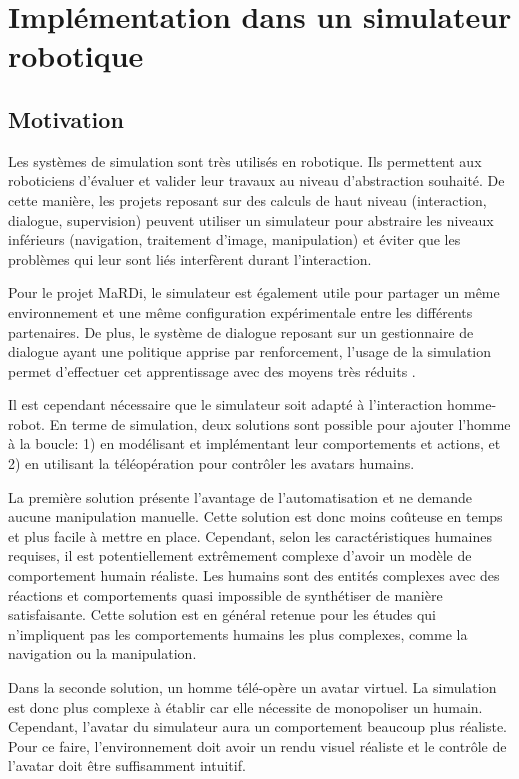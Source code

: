 \documentclass[a4paper,11pt,twoside]{StyleThese}
\begin{document}
\section{Implémentation dans un simulateur robotique}

\subsection{Motivation}
Les systèmes de simulation sont très utilisés en robotique. Ils permettent aux roboticiens d'évaluer et valider leur travaux au niveau d'abstraction souhaité. De cette manière, les projets reposant sur des calculs de haut niveau (interaction, dialogue, supervision) peuvent utiliser un simulateur pour abstraire les niveaux inférieurs (navigation, traitement d'image, manipulation) et éviter que les problèmes qui leur sont liés interfèrent durant l'interaction.

Pour le projet MaRDi, le simulateur est également utile pour partager un même environnement et une même configuration expérimentale entre les différents partenaires. De plus, le système de dialogue reposant sur un gestionnaire de dialogue ayant une politique apprise par renforcement, l'usage de la simulation permet d'effectuer cet apprentissage avec des moyens très réduits \cite{simpar_2014}.

Il est cependant nécessaire que le simulateur soit adapté à l'interaction homme-robot. 
En terme de simulation, deux solutions sont possible pour ajouter l'homme à la boucle: 1) en modélisant et implémentant leur comportements et actions, et 2) en utilisant la téléopération pour contrôler les avatars humains.

La première solution présente l'avantage de l'automatisation et ne demande aucune manipulation manuelle. Cette solution est donc moins coûteuse en temps et plus facile à mettre en place. Cependant, selon les caractéristiques humaines requises, il est potentiellement extrêmement complexe d'avoir un modèle de comportement humain réaliste. Les humains sont des entités complexes avec des réactions et comportements quasi impossible de synthétiser de manière satisfaisante. Cette solution est en général retenue pour les études qui n'impliquent pas les comportements humains les plus complexes, comme la navigation ou la manipulation.

Dans la seconde solution, un homme télé-opère un avatar virtuel. La simulation est donc plus complexe à établir car elle nécessite de monopoliser un humain. Cependant, l'avatar du simulateur aura un comportement beaucoup plus réaliste. Pour ce faire, l'environnement doit avoir un rendu visuel réaliste et le contrôle de l'avatar doit être suffisamment intuitif.
\end{document}
